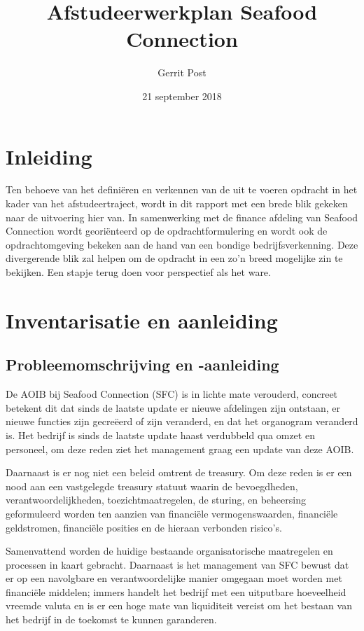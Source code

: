 \documentclass[10pt,a4paper,twoside]{report}
\title{Afstudeerwerkplan Seafood Connection}
\author{Gerrit Post}
\date{21 september 2018}
\newcommand\blankpage{%
    \null
    \thispagestyle{empty}%
    \newpage}
\begin{document}

\afterpage{\blankpage}
\setcounter{page}{2}
\tableofcontents
\thispagestyle{empty}

\chapter*{Inleiding}
\thispagestyle{empty}
Ten behoeve van het definiëren en verkennen van de uit te voeren opdracht in het kader van het afstudeertraject, wordt in dit rapport met een brede blik gekeken naar de uitvoering hier van. In samenwerking met de finance afdeling van Seafood Connection wordt georiënteerd op de opdrachtformulering en wordt ook de opdrachtomgeving bekeken aan de hand van een bondige bedrijfsverkenning. Deze divergerende blik zal helpen om de opdracht in een zo’n breed mogelijke zin te bekijken. Een stapje terug doen voor perspectief als het ware.

\chapter{Inventarisatie en aanleiding}
\section{Probleemomschrijving en -aanleiding}
De AOIB bij Seafood Connection (SFC) is in lichte mate verouderd, concreet betekent dit dat sinds de laatste update er nieuwe afdelingen zijn ontstaan, er nieuwe functies zijn gecreëerd of zijn veranderd, en dat het organogram veranderd is. Het bedrijf is sinds de laatste update haast verdubbeld qua omzet en personeel, om deze reden ziet het management graag een update van deze AOIB. 

Daarnaast is er nog niet een beleid omtrent de treasury. Om deze reden is er een nood aan een vastgelegde treasury statuut waarin de bevoegdheden, verantwoordelijkheden, toezichtmaatregelen, de sturing, en beheersing geformuleerd worden ten aanzien van financiële vermogenswaarden, financiële geldstromen, financiële posities en de hieraan verbonden risico’s. \citep{ede,handreiking}

Samenvattend worden de huidige bestaande organisatorische maatregelen en processen in kaart gebracht. Daarnaast is het management van SFC bewust dat er op een navolgbare en verantwoordelijke manier omgegaan moet worden met financiële middelen; immers handelt het bedrijf met een uitputbare hoeveelheid vreemde valuta en is er een hoge mate van liquiditeit vereist om het bestaan van het bedrijf in de toekomst te kunnen garanderen.
\end{document}
